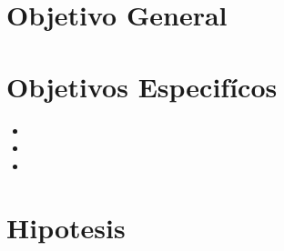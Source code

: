 \lipsum[1-3]

\section{Objetivo General}

\lipsum[2]

\section{Objetivos Especifícos}

\begin{itemize}
    \item \lipsum[3][2-3]
    \item \lipsum[5][2-3]
    \item \lipsum[6][2-3]
\end{itemize}


\section{Hipotesis}

\lipsum[4]